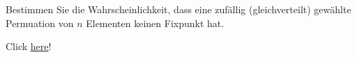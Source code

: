 \begin{exercise}

Bestimmen Sie die Wahrscheinlichkeit, dass eine zufällig (gleichverteilt) gewählte Permuation von $n$ Elementen keinen Fixpunkt hat.

\end{exercise}


\begin{solution}

Click \href{https://de.wikipedia.org/wiki/Fixpunktfreie_Permutation}{here}!

\end{solution}
